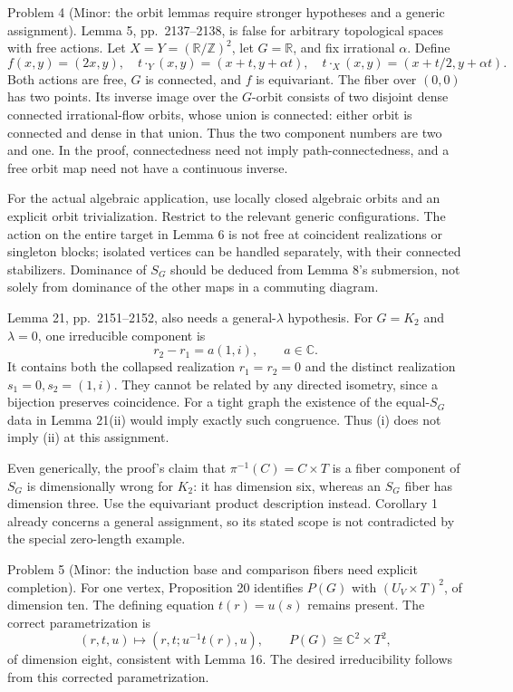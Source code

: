 \documentclass[10pt]{article}
\begin{document}
Problem 4 (Minor: the orbit lemmas require stronger hypotheses and a generic assignment).  Lemma 5, pp. 2137–2138, is false for arbitrary topological spaces with free actions. Let \(X=Y=(\mathbb R/\mathbb Z)^2\), let \(G=\mathbb R\), and fix irrational \(\alpha\). Define \[f(x,y)=(2x,y),\quad
 t\cdot_Y(x,y)=(x+t,y+\alpha t),\quad
 t\cdot_X(x,y)=(x+t/2,y+\alpha t).\] Both actions are free, \(G\) is connected, and \(f\) is equivariant. The fiber over \((0,0)\) has two points. Its inverse image over the \(G\)-orbit consists of two disjoint dense connected irrational-flow orbits, whose union is connected: either orbit is connected and dense in that union. Thus the two component numbers are two and one. In the proof, connectedness need not imply path-connectedness, and a free orbit map need not have a continuous inverse.\par
For the actual algebraic application, use locally closed algebraic orbits and an explicit orbit trivialization. Restrict to the relevant generic configurations. The action on the entire target in Lemma 6 is not free at coincident realizations or singleton blocks; isolated vertices can be handled separately, with their connected stabilizers. Dominance of \(S_G\) should be deduced from Lemma 8’s submersion, not solely from dominance of the other maps in a commuting diagram.\par
Lemma 21, pp. 2151–2152, also needs a general-\(\lambda\) hypothesis. For \(G=K_2\) and \(\lambda=0\), one irreducible component is \[r_2-r_1=a(1,i),\qquad a\in\mathbb C.\] It contains both the collapsed realization \(r_1=r_2=0\) and the distinct realization \(s_1=0,s_2=(1,i)\). They cannot be related by any directed isometry, since a bijection preserves coincidence. For a tight graph the existence of the equal-\(S_G\) data in Lemma 21(ii) would imply exactly such congruence. Thus (i) does not imply (ii) at this assignment.\par
Even generically, the proof’s claim that \(\pi^{-1}(C)=C\times T\) is a fiber component of \(S_G\) is dimensionally wrong for \(K_2\): it has dimension six, whereas an \(S_G\) fiber has dimension three. Use the equivariant product description instead. Corollary 1 already concerns a general assignment, so its stated scope is not contradicted by the special zero-length example.\par
Problem 5 (Minor: the induction base and comparison fibers need explicit completion).  For one vertex, Proposition 20 identifies \(P(G)\) with \((U_V\times T)^2\), of dimension ten. The defining equation \(t(r)=u(s)\) remains present. The correct parametrization is \[(r,t,u)\longmapsto(r,t;u^{-1}t(r),u),\qquad
 P(G)\cong\mathbb C^2\times T^2,\] of dimension eight, consistent with Lemma 16. The desired irreducibility follows from this corrected parametrization.\par
\end{document}
